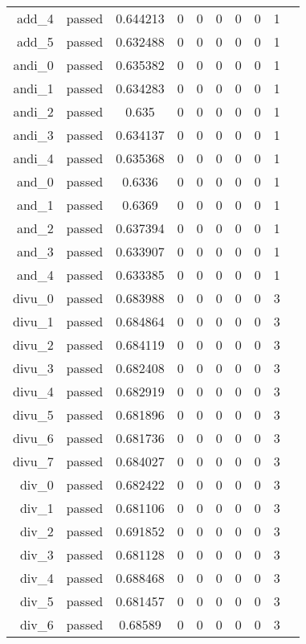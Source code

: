 \begin{longtable}{r|ccccccccc}
    add\_4 & passed & 0.644213 & 0 & 0 & 0 & 0 & 0 & 1 \\
    add\_5 & passed & 0.632488 & 0 & 0 & 0 & 0 & 0 & 1 \\
    andi\_0 & passed & 0.635382 & 0 & 0 & 0 & 0 & 0 & 1 \\
    andi\_1 & passed & 0.634283 & 0 & 0 & 0 & 0 & 0 & 1 \\
    andi\_2 & passed & 0.635 & 0 & 0 & 0 & 0 & 0 & 1 \\
    andi\_3 & passed & 0.634137 & 0 & 0 & 0 & 0 & 0 & 1 \\
    andi\_4 & passed & 0.635368 & 0 & 0 & 0 & 0 & 0 & 1 \\
    and\_0 & passed & 0.6336 & 0 & 0 & 0 & 0 & 0 & 1 \\
    and\_1 & passed & 0.6369 & 0 & 0 & 0 & 0 & 0 & 1 \\
    and\_2 & passed & 0.637394 & 0 & 0 & 0 & 0 & 0 & 1 \\
    and\_3 & passed & 0.633907 & 0 & 0 & 0 & 0 & 0 & 1 \\
    and\_4 & passed & 0.633385 & 0 & 0 & 0 & 0 & 0 & 1 \\
    divu\_0 & passed & 0.683988 & 0 & 0 & 0 & 0 & 0 & 3 \\
    divu\_1 & passed & 0.684864 & 0 & 0 & 0 & 0 & 0 & 3 \\
    divu\_2 & passed & 0.684119 & 0 & 0 & 0 & 0 & 0 & 3 \\
    divu\_3 & passed & 0.682408 & 0 & 0 & 0 & 0 & 0 & 3 \\
    divu\_4 & passed & 0.682919 & 0 & 0 & 0 & 0 & 0 & 3 \\
    divu\_5 & passed & 0.681896 & 0 & 0 & 0 & 0 & 0 & 3 \\
    divu\_6 & passed & 0.681736 & 0 & 0 & 0 & 0 & 0 & 3 \\
    divu\_7 & passed & 0.684027 & 0 & 0 & 0 & 0 & 0 & 3 \\
    div\_0 & passed & 0.682422 & 0 & 0 & 0 & 0 & 0 & 3 \\
    div\_1 & passed & 0.681106 & 0 & 0 & 0 & 0 & 0 & 3 \\
    div\_2 & passed & 0.691852 & 0 & 0 & 0 & 0 & 0 & 3 \\
    div\_3 & passed & 0.681128 & 0 & 0 & 0 & 0 & 0 & 3 \\
    div\_4 & passed & 0.688468 & 0 & 0 & 0 & 0 & 0 & 3 \\
    div\_5 & passed & 0.681457 & 0 & 0 & 0 & 0 & 0 & 3 \\
    div\_6 & passed & 0.68589 & 0 & 0 & 0 & 0 & 0 & 3 \\

\end{longtable}
